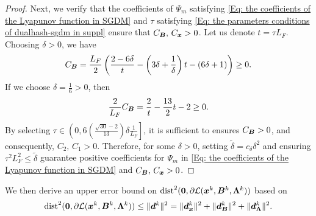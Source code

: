 \begin{proof}
    Next, we verify that the coefficients of $\Psi_m$ satisfying \eqref{Eq: the coefficients of the Lyapunov function in SGDM}
    and $\tau$ satisfying \eqref{Eq: the parameters conditions of dualhash-sgdm in suppl}
    ensure that $C_{\bm{B}},\, C_{\bm{x}}> 0$. Let us denote $t = \tau L_{F}$. Choosing
    $\delta>0$, we have
    \begin{align*}
        C_{\bm{B}}= \frac{L_{F}}{2}\left(\frac{2 - 6\delta}{t}- \left(3\delta + \frac{1}{\delta}\right)t- (6\delta+1) \right) \geq 0.
    \end{align*}
    If we choose $\delta = \frac{1}{6}> 0$, then
    \[
        \frac{2}{L_{F}}C_{\bm{B}}= \frac{2}{t}- \frac{13}{2}t - 2 \geq 0.
    \]
    By selecting
    $\tau \in \left(0, 6(\frac{\sqrt{30}-2}{13})\delta \frac{1}{L_{F}}\right]$, it
    is sufficient to ensures $C_{\bm{B}}> 0$, and consequently, $C_{2},\,C_{1}> 0$.
    Therefore, for some $\delta >0$, setting
    $\tilde{\delta}= c_{\delta}\delta^{2}$ and ensuring
    $\tau^{2}L_{F}^{2}\leq \tilde{\delta}$ guarantee positive coefficients for
    $\Psi_m$ in \eqref{Eq: the coefficients of the Lyapunov function in SGDM}
    and $C_{\bm{B}}, \, C_{\bm{x}}>0$. 
\end{proof}
We then derive an upper error bound on $\text{dist}^{2}(\bm{0}, \partial \mathcal{L}(\bm{x}^{k}, \bm{B}^{k}, \bm{\Lambda}^{k}))$ based on
\begin{align}
    \label{Eq: the stationarity error bound in proof}\text{dist}^{2}(\bm{0}, \partial \mathcal{L}(\bm{x}^{k}, \bm{B}^{k}, \bm{\Lambda}^{k})) \leq \| \bm{d}^{k}\|^{2}=\|\bm{d}_{\bm{x}}^{k}\|^{2}+ \| \bm{d}_{\bm{B}}^{k}\|^{2}+ \| \bm{d}_{\bm{\Lambda}}^{k}\|^{2}.
\end{align}

